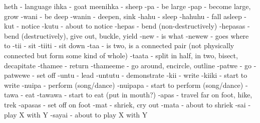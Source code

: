 heth        - language
ihka        - goat
meenihka    - sheep
-pa         - be large
-pap        - become large, grow
-wani       - be deep
-wanin      - deepen, sink
-hahu       - sleep
-hahuhu     - fall asleep
-kut        - notice
-kutu       - about to notice
-hepas      - bend (non-destructively)
-hepasas    - bend (destructively), give out, buckle, yield
-new        - is what
-newew      - goes where to
-tii        - sit
-tiiti      - sit down
-taa        - is two, is a connected pair (not physically connected but form some kind of whole)
-taata      - split in half, in two, bisect, decapitate
-thamee     - return
-thameeme   - go around, encircle, outline
-patwe      - go
-patwewe    - set off
-untu       - lead
-untutu     - demonstrate
-kii        - write
-kiiki      - start to write
-nuipa      - perform (song/dance)
-nuipapa    - start to perform (song/dance)
-tawa       - eat
-tawawa     - start to eat (put in mouth?)
-apas       - travel far on foot, hike, trek
-apasas     - set off on foot
-mat        - shriek, cry out
-mata       - about to shriek
-sai        - play X with Y
-sayai      - about to play X with Y